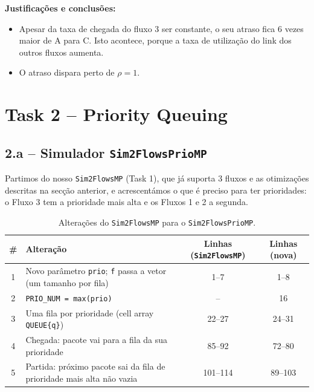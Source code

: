 \documentclass[11pt,a4paper]{article}
\newcommand{\code}[1]{\texttt{#1}}
\begin{document}
\vspace{1em}
\vspace{1em}
\vspace{2em} 
\noindent\textbf{Justificações e conclusões:}
\begin{itemize}
  \item Apesar da taxa de chegada do fluxo 3 ser constante, o seu atraso fica 6 vezes maior de A para C. Isto acontece, porque a taxa de utilização do link dos outros fluxos aumenta. 
  \item O atraso dispara perto de $\rho = 1$.
\end{itemize}
\section{Task 2 -- Priority Queuing}

\subsection{2.a -- Simulador \code{Sim2FlowsPrioMP}}


Partimos do nosso \code{Sim2FlowsMP} (Task 1), que já suporta 3 fluxos e as otimizações descritas na secção anterior, e acrescentámos o que é preciso para ter prioridades: o Fluxo 3 tem a prioridade mais alta e os Fluxos 1 e 2 a segunda.

\begin{table}[H]
\centering
\caption{Alterações do \code{Sim2FlowsMP} para o \code{Sim2FlowsPrioMP}.}
\begin{tabularx}{\textwidth}{c X c c}
\toprule
\# & Alteração & Linhas (\code{Sim2FlowsMP}) & Linhas (nova) \\
\midrule
1 & Novo parâmetro \code{prio}; \code{f} passa a vetor (um tamanho por fila) & 1--7 & 1--8 \\
2 & \code{PRIO\_NUM = max(prio)} & -- & 16 \\
3 & Uma fila por prioridade (cell array \code{QUEUE\{q\}}) & 22--27 & 24--31 \\
4 & Chegada: pacote vai para a fila da sua prioridade & 85--92 & 72--80 \\
5 & Partida: próximo pacote sai da fila de prioridade mais alta não vazia & 101--114 & 89--103 \\
\bottomrule
\end{tabularx}
\end{table}
\end{document}
